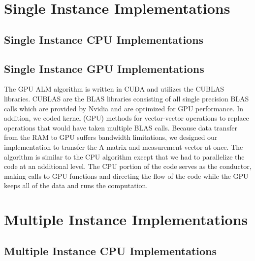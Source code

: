\documentclass[10pt,twocolumn,letterpaper]{article}
\begin{document}

\section{Single Instance Implementations}

\subsection{Single Instance CPU Implementations}

\subsection{Single Instance GPU Implementations}
The GPU ALM algorithm is written in CUDA and utilizes the CUBLAS libraries.
CUBLAS are the BLAS libraries consisting of all single precision BLAS calls
which are provided by Nvidia and are optimized for GPU performance. In
addition, we coded kernel (GPU) methods for vector-vector operations to replace
operations that would have taken multiple BLAS calls. Because data transfer from the RAM to GPU suffers bandwidth limitations, we designed our implementation to transfer the A matrix and measurement vector at once.  The algorithm is similar
to the CPU algorithm except that we had to parallelize the code at an
additional level. The CPU portion of the code serves as the conductor, making
calls to GPU functions and directing the flow of the code while the GPU keeps all of the data and runs the computation.

\section{Multiple Instance Implementations}

\subsection{Multiple Instance CPU Implementations}
\end{document}
